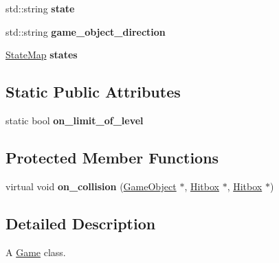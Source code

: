\begin{DoxyCompactItemize}
\item 
std\+::string {\bfseries state}\hypertarget{classengine_1_1_game_object_a485c6dde0f7daed4ce480d577e621f87}{}\label{classengine_1_1_game_object_a485c6dde0f7daed4ce480d577e621f87}

\item 
std\+::string {\bfseries game\+\_\+object\+\_\+direction}\hypertarget{classengine_1_1_game_object_a44e5d9209f5ff0f19d83f7d221037632}{}\label{classengine_1_1_game_object_a44e5d9209f5ff0f19d83f7d221037632}

\item 
\hyperlink{classengine_1_1_state_map}{State\+Map} {\bfseries states}\hypertarget{classengine_1_1_game_object_a109beba63a929e3be8c4c958591cd1a9}{}\label{classengine_1_1_game_object_a109beba63a929e3be8c4c958591cd1a9}

\end{DoxyCompactItemize}
\subsection*{Static Public Attributes}
\begin{DoxyCompactItemize}
\item 
static bool {\bfseries on\+\_\+limit\+\_\+of\+\_\+level}\hypertarget{classengine_1_1_game_object_aea78ad4cdb280a61b050b89a280af7bd}{}\label{classengine_1_1_game_object_aea78ad4cdb280a61b050b89a280af7bd}

\end{DoxyCompactItemize}
\subsection*{Protected Member Functions}
\begin{DoxyCompactItemize}
\item 
virtual void {\bfseries on\+\_\+collision} (\hyperlink{classengine_1_1_game_object}{Game\+Object} $\ast$, \hyperlink{classengine_1_1_hitbox}{Hitbox} $\ast$, \hyperlink{classengine_1_1_hitbox}{Hitbox} $\ast$)\hypertarget{classengine_1_1_game_object_a0bf122fe605b95a4b156e28252a167ee}{}\label{classengine_1_1_game_object_a0bf122fe605b95a4b156e28252a167ee}

\end{DoxyCompactItemize}


\subsection{Detailed Description}
A \hyperlink{classengine_1_1_game}{Game} class. 

